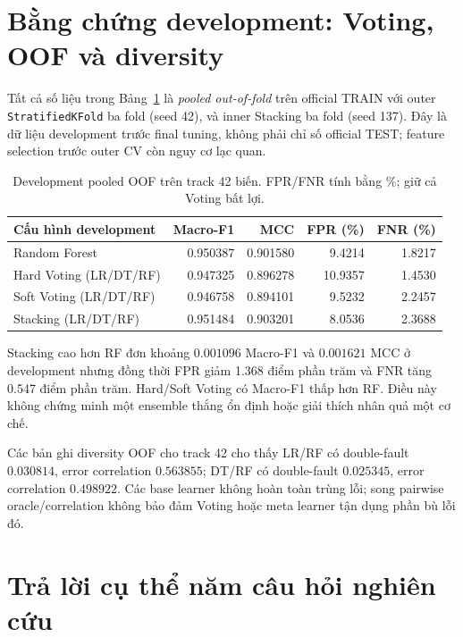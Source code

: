 
\clearpage %
\section{Bằng chứng development: Voting, OOF và diversity}
\label{sec:revision-development}
Tất cả số liệu trong Bảng~\ref{tab:rev-dev} là \emph{pooled out-of-fold} trên official TRAIN với outer \texttt{StratifiedKFold} ba fold (seed 42), và inner Stacking ba fold (seed 137). Đây là dữ liệu development trước final tuning, không phải chỉ số official TEST; feature selection trước outer CV còn nguy cơ lạc quan.

\begin{table}[H]\centering\small
\caption{Development pooled OOF trên track 42 biến. FPR/FNR tính bằng \%; giữ cả Voting bất lợi.}
\label{tab:rev-dev}
\begin{tabular}{lrrrr}\toprule
Cấu hình development & Macro-F1 & MCC & FPR (\%) & FNR (\%)\\\midrule
Random Forest & 0.950387 & 0.901580 & 9.4214 & 1.8217\\
Hard Voting (LR/DT/RF) & 0.947325 & 0.896278 & 10.9357 & 1.4530\\
Soft Voting (LR/DT/RF) & 0.946758 & 0.894101 & 9.5232 & 2.2457\\
Stacking (LR/DT/RF) & 0.951484 & 0.903201 & 8.0536 & 2.3688\\\bottomrule
\end{tabular}
\end{table}
Stacking cao hơn RF đơn khoảng $0.001096$ Macro-F1 và $0.001621$ MCC ở development nhưng đồng thời FPR giảm 1.368 điểm phần trăm và FNR tăng 0.547 điểm phần trăm. Hard/Soft Voting có Macro-F1 thấp hơn RF. Điều này không chứng minh một ensemble thắng ổn định hoặc giải thích nhân quả một cơ chế.

Các bản ghi diversity OOF cho track 42 cho thấy LR/RF có double-fault $0.030814$, error correlation $0.563855$; DT/RF có double-fault $0.025345$, error correlation $0.498922$. Các base learner không hoàn toàn trùng lỗi; song pairwise oracle/correlation không bảo đảm Voting hoặc meta learner tận dụng phần bù lỗi đó.

\section{Trả lời cụ thể năm câu hỏi nghiên cứu}
\label{sec:revision-rq-all}

